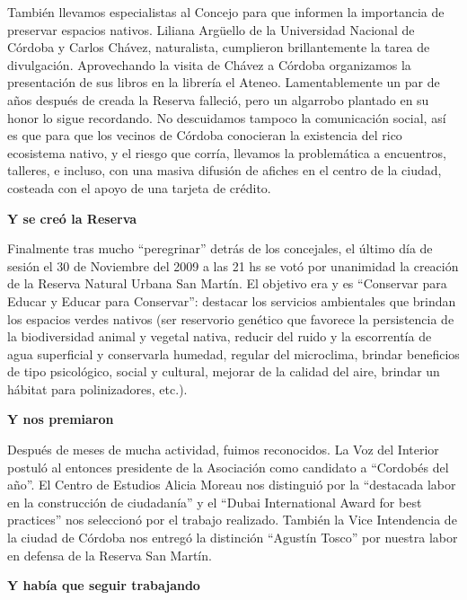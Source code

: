 \begin{fullwidth}
También llevamos especialistas al Concejo para que informen la
importancia de preservar espacios nativos. Liliana Argüello de la
Universidad Nacional de Córdoba y Carlos Chávez, naturalista, cumplieron
brillantemente la tarea de divulgación. Aprovechando la visita de Chávez
a Córdoba organizamos la presentación de sus libros en la librería el
Ateneo. Lamentablemente un par de años después de creada la Reserva
falleció, pero un algarrobo plantado en su honor lo sigue recordando. No
descuidamos tampoco la comunicación social, así es que para que los
vecinos de Córdoba conocieran la existencia del rico ecosistema nativo,
y el riesgo que corría, llevamos la problemática a encuentros, talleres,
e incluso, con una masiva difusión de afiches en el centro de la ciudad,
costeada con el apoyo de una tarjeta de crédito.

\textbf{Y se creó la Reserva}

Finalmente tras mucho ``peregrinar'' detrás de los concejales, el último
día de sesión el 30 de Noviembre del 2009 a las 21 hs se votó por
unanimidad la creación de la Reserva Natural Urbana San Martín. El
objetivo era y es ``Conservar para Educar y Educar para Conservar'':
destacar los servicios ambientales que brindan los espacios verdes
nativos (ser reservorio genético que favorece la persistencia de la
biodiversidad animal y vegetal nativa, reducir del ruido y la
escorrentía de agua superficial y conservarla humedad, regular del
microclima, brindar beneficios de tipo psicológico, social y cultural,
mejorar de la calidad del aire, brindar un hábitat para polinizadores,
etc.).

\textbf{Y nos premiaron}

Después de meses de mucha actividad, fuimos reconocidos. La Voz del
Interior postuló al entonces presidente de la Asociación como candidato
a ``Cordobés del año''. El Centro de Estudios Alicia Moreau nos
distinguió por la ``destacada labor en la construcción de ciudadanía'' y
el ``Dubai International Award for best practices'' nos seleccionó por
el trabajo realizado. También la Vice Intendencia de la ciudad de
Córdoba nos entregó la distinción ``Agustín Tosco'' por nuestra labor en
defensa de la Reserva San Martín.

\textbf{Y había que seguir trabajando}


\end{fullwidth}
